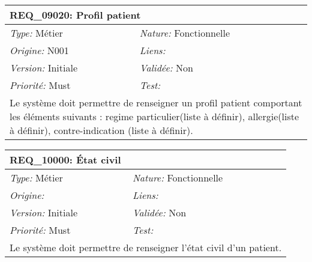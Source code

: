 \begin{table}[!h]

\begin{tabular}{|p{60mm}p{100mm}|}

\hline

\multicolumn{2}{|l|}{\textbf{REQ\_09020:} Profil patient} \\ \hline

\emph{Type:} Métier & \emph{Nature:} Fonctionnelle \\

\emph{Origine:} N001 & \emph{Liens:}  \\

\emph{Version:} Initiale & \emph{Validée:} Non \\

\emph{Priorité:} Must & \emph{Test:} \\ \hline

\multicolumn{2}{|p{16cm}|}{Le système doit permettre de renseigner un profil patient comportant les éléments suivants : regime particulier(liste à définir), allergie(liste à définir), contre-indication (liste à définir).} \\ \hline

\end{tabular}

\end{table}



\begin{table}[!h]

\begin{tabular}{|p{60mm}p{100mm}|}

\hline

\multicolumn{2}{|l|}{\textbf{REQ\_10000:} État civil} \\ \hline

\emph{Type:} Métier & \emph{Nature:} Fonctionnelle \\

\emph{Origine:}  & \emph{Liens:}  \\

\emph{Version:} Initiale & \emph{Validée:} Non \\

\emph{Priorité:} Must & \emph{Test:} \\ \hline

\multicolumn{2}{|p{16cm}|}{Le système doit permettre de renseigner l'état civil d'un patient.} \\ \hline

\end{tabular}

\end{table}



